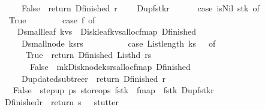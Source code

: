 \begin{isabellebody}
\ \ \ \ \ \ {\isacharbar}\ False\ {\isasymRightarrow}\ {\isacharparenleft}return\ {\isacharparenleft}D{\isacharunderscore}finished\ r{}{\isacharparenright}\ {\isacharparenright}{\isacharparenright}{\isacharparenright}{\isacharparenright}\isanewline
\ \ {\isacharbar}\ D{\isacharunderscore}up{\isacharparenleft}f{\isacharcomma}stk{\isacharcomma}r{}{\isacharparenright}\ {\isasymRightarrow}\ {\isacharparenleft}\isanewline
\ \ \ \ case\ is{\isacharunderscore}Nil{\isacharprime}\ stk\ of\isanewline
\ \ \ \ True\ {\isasymRightarrow}\ {\isacharparenleft}\isanewline
\ \ \ \ \ \ case\ f\ of\isanewline
\ \ \ \ \ \ D{\isacharunderscore}small{\isacharunderscore}leaf\ kvs\ {\isasymRightarrow}\ {\isacharparenleft}Disk{\isacharunderscore}leaf{\isacharparenleft}kvs{\isacharparenright}{\isacharbar}{\isachargreater}alloc{\isacharbar}{\isachargreater}fmap\ D{\isacharunderscore}finished{\isacharparenright}\isanewline
\ \ \ \ \ \ {\isacharbar}\ D{\isacharunderscore}small{\isacharunderscore}node\ {\isacharparenleft}ks{\isacharcomma}rs{\isacharparenright}\ {\isasymRightarrow}\ {\isacharparenleft}\isanewline
\ \ \ \ \ \ \ \ case\ List{\isachardot}length\ ks\ {\isacharequal}\ {}\ of\isanewline
\ \ \ \ \ \ \ \ True\ {\isasymRightarrow}\ return\ {\isacharparenleft}D{\isacharunderscore}finished\ {\isacharparenleft}List{\isachardot}hd\ rs{\isacharparenright}{\isacharparenright}\isanewline
\ \ \ \ \ \ \ \ {\isacharbar}\ False\ {\isasymRightarrow}\ {\isacharparenleft}mk{\isacharunderscore}Disk{\isacharunderscore}node{\isacharparenleft}ks{\isacharcomma}rs{\isacharparenright}{\isacharbar}{\isachargreater}alloc{\isacharbar}{\isachargreater}fmap\ D{\isacharunderscore}finished{\isacharparenright}{\isacharparenright}\isanewline
\ \ \ \ \ \ {\isacharbar}\ D{\isacharunderscore}updated{\isacharunderscore}subtree{\isacharparenleft}r{\isacharparenright}\ {\isasymRightarrow}\ {\isacharparenleft}return\ {\isacharparenleft}D{\isacharunderscore}finished\ r{\isacharparenright}{\isacharparenright}{\isacharparenright}\isanewline
\ \ \ \ {\isacharbar}\ False\ {\isasymRightarrow}\ {\isacharparenleft}step{\isacharunderscore}up\ ps{}\ store{\isacharunderscore}ops\ {\isacharparenleft}f{\isacharcomma}stk{\isacharparenright}\ {\isacharbar}{\isachargreater}\ fmap\ {\isacharparenleft}{\isacharpercent}\ {\isacharparenleft}f{\isacharcomma}stk{\isacharparenright}{\isachardot}\ D{\isacharunderscore}up{\isacharparenleft}f{\isacharcomma}stk{\isacharcomma}r{}{\isacharparenright}{\isacharparenright}{\isacharparenright}{\isacharparenright}\isanewline
\ \ {\isacharbar}\ D{\isacharunderscore}finished{\isacharparenleft}r{\isacharparenright}\ {\isasymRightarrow}\ {\isacharparenleft}return\ s{\isacharparenright}\ \ {\isacharparenleft}{\isacharasterisk}\ stutter\ {\isacharasterisk}{\isacharparenright}{\isacharparenright}{\isachardoublequoteclose}\isanewline
\isanewline
\isanewline
%
\isadelimtheory
\isanewline
%
\endisadelimtheory
%
\isatagtheory
{}\isamarkupfalse%
%
\endisatagtheory
{\isafoldtheory}%
%
\isadelimtheory
%
\endisadelimtheory
\end{isabellebody}%
